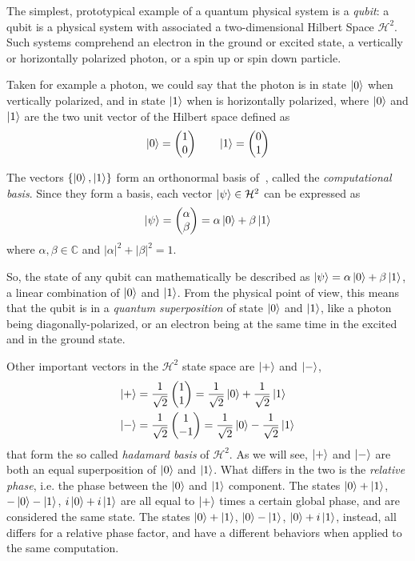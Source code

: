 \documentclass[10pt,a4paper, titlepage]{report}
\theoremstyle{definition}
\newcommand{\kp}{\ket{\psi}}
\newcommand{\kz}{\ket{0}}
\newcommand{\ko}{\ket{1}}
\newcommand{\kpl}{\ket{+}}
\newcommand{\oost}{\frac{1}{\sqrt{2}}}
\newcommand{\km}{\ket{-}}
\newcommand{\calH}{\mathcal{H}}
\newcommand{\calHt}{\mathcal{H}^2}
\begin{document}
The simplest, prototypical example of a quantum physical system is a \textit{qubit}: a qubit is a physical system with associated a two-dimensional Hilbert Space $\calH^2$. Such systems comprehend an electron in the ground or excited state, a vertically or horizontally polarized photon, or a spin up or spin down particle.

Taken for example a photon, we could say that the photon is in state $\kz$ when vertically polarized, and in state $\ko$ when is horizontally polarized, where $\kz$ and $\ko$ are the two unit vector of the Hilbert space defined as
\[
	\kz = \begin{pmatrix}
	1 \\
	0
	\end{pmatrix} \qquad
	\ko = \begin{pmatrix}
	0 \\
	1
	\end{pmatrix}
\]

The vectors $\{\kz, \ko\}$ form an orthonormal basis of $\ $, called the \textit{computational basis}. Since they form a basis, each vector $\kp \in \calH^2$ can be expressed as 
	\[\kp = \begin{pmatrix}
	\alpha \\
	\beta
	\end{pmatrix} = 
	\alpha\kz + \beta\ko
	\]
where $\alpha, \beta \in \mathbb{C}$ and $|\alpha|^2 + |\beta|^2 = 1$.

So, the state of any qubit can mathematically be described as $\kp = \alpha\kz +\beta\ko$, a linear combination of $\kz$ and $\ko$. From the physical point of view, this means that the qubit is in a \textit{quantum superposition} of state $\kz$ and $\ko$, like a photon being diagonally-polarized, or an electron being at the same time in the excited and in the ground state.

Other important vectors in the $\calHt$ state space are $\kpl$ and $\km$,
\begin{align*}
	\kpl = \oost &\begin{pmatrix}
	1 \\
	1
	\end{pmatrix}  = \oost\kz + \oost\ko   \\
	\km  = \oost &\begin{pmatrix}
	1 \\
	-1
	\end{pmatrix}  = \oost\kz - \oost\ko 
\end{align*}
that form the so called \textit{hadamard basis} of $\calHt$. As we will see, $\kpl$ and $\km$ are both an equal superposition of $\kz$ and $\ko$. What differs in the two is the \textit{relative phase}, i.e. the phase between the $\kz$ and $\ko$ component. The states $\kz + \ko$, $-\kz -\ko$, $i\kz + i\ko$ are all equal to $\kpl$ times a certain global phase, and are considered the same state. The states $\kz + \ko$, $\kz - \ko$, $\kz +i\ko$, instead, all differs for a relative phase factor, and have a different behaviors when applied to the same computation. 
\end{document}
